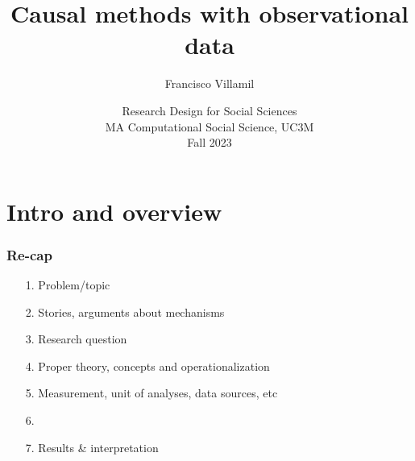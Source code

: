 \documentclass[aspectratio=43]{beamer}
\title[Lecture 4: Causal methods]{\Large Causal methods with observational data}
\author[]{Francisco Villamil}
\date[]{Research Design for Social Sciences\\MA Computational Social Science, UC3M\\Fall 2023}
\begin{document}

\begin{frame}
  \titlepage
\end{frame}

\section{Intro and overview}

\begin{frame}
\frametitle{Re-cap}
\centering

\begin{itemize}
  \item[1.] Problem/topic
  \item[2.] Stories, arguments about mechanisms
  \item[3.] Research question
  \item[4.] Proper theory, concepts and operationalization
  \item[5.] Measurement, unit of analyses, data sources, etc
  \item[6.] 
  \item[7.] Results \& interpretation
\end{itemize}

\end{frame}
\end{document}
